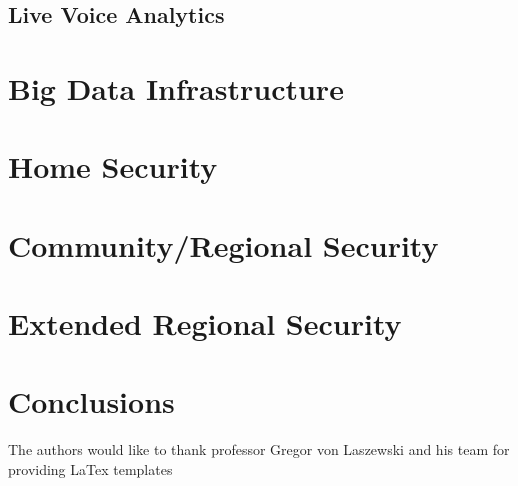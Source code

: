 \documentclass[sigconf]{acmart}
\begin{document}
\subsection{Live Voice Analytics}

\section{Big Data Infrastructure}

\section{Home Security}

\section{Community/Regional Security}

\section{Extended Regional Security}

\section{Conclusions}

\begin{acks}
The authors would like to thank professor Gregor von Laszewski and his team for providing LaTex templates
\end{acks}


 
\end{document}
